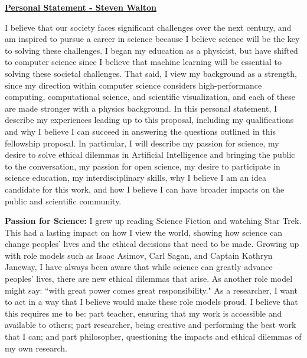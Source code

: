 \documentclass[12pt]{article}
\begin{document}
\begin{center}
\underline{\bf Personal Statement - Steven Walton}\\
\end{center}
I believe that our society faces significant challenges over the next century,
and am inspired to pursue a career in science because I believe science will
be the key to solving these challenges.
%
I began my education as a physicist, but have shifted to computer science since
I believe that machine learning will be essential to solving these societal challenges.
%
That said, I view my background as a strength, 
since my direction within computer science considers high-performance computing, 
computational science, and scientific visualization, and each of these are
made stronger with a physics background.
%
In this personal statement, I describe my experiences leading up to this proposal,
including my qualifications and why I believe I can succeed in answering the questions
outlined in this fellowship proposal.
%
In particular, I will describe my passion for science,
my desire to solve ethical dilemmas in Artificial Intelligence and bringing the
public to the conversation,
my passion for open science,
my desire to participate in science education,
my interdisciplinary skills,
why I believe I am an idea candidate for this work,
and how I believe I can have broader impacts on the public and scientific
community.
%         
%

\textbf{Passion for Science:} I grew up reading Science Fiction and watching
Star Trek. This had a lasting impact on how I view the world, showing how
science can change peoples' lives and the ethical decisions that need to be
made. Growing up with role models such as Isaac Asimov, Carl Sagan, and Captain
Kathryn Janeway, I have always been aware that while science can greatly advance
peoples' lives, there are new ethical dilemmas that arise. As another role model
might say: ``with great power comes great responsibility." As a researcher, I
want to act in a way that I believe would make these role models proud. I
believe that this requires me to be: part teacher, ensuring that my work is
accessible and available to others; part researcher, being creative and
performing the best work that I can; and part philosopher, questioning the
impacts and ethical dilemmas of my own research.
\end{document}
